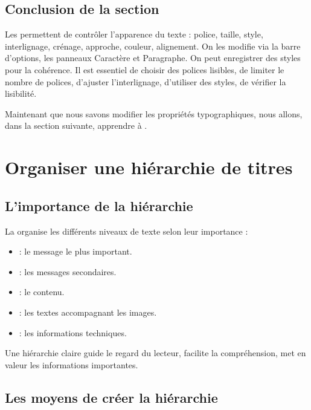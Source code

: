 \subsection*{Conclusion de la section}

Les  permettent de contrôler l'apparence du texte : police, taille, style, interlignage, crénage, approche, couleur, alignement. On les modifie via la barre d'options, les panneaux Caractère et Paragraphe. On peut enregistrer des styles pour la cohérence. Il est essentiel de choisir des polices lisibles, de limiter le nombre de polices, d'ajuster l'interlignage, d'utiliser des styles, de vérifier la lisibilité.

Maintenant que nous savons modifier les propriétés typographiques, nous allons, dans la section suivante, apprendre à .

\section{Organiser une hiérarchie de titres}

\subsection{L'importance de la hiérarchie}

La  organise les différents niveaux de texte selon leur importance :

\begin{itemize}
    \item {} : le message le plus important.
    \item {} : les messages secondaires.
    \item {} : le contenu.
    \item {} : les textes accompagnant les images.
    \item {} : les informations techniques.
\end{itemize}

Une hiérarchie claire guide le regard du lecteur, facilite la compréhension, met en valeur les informations importantes.

\subsection{Les moyens de créer la hiérarchie}

